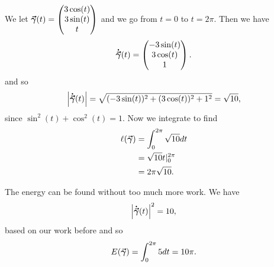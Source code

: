 \documentclass[12pt]{article} %
\begin{document}
\begin{solution}
We let $\boldsymbol{\vec{\gamma}}(t) = \begin{pmatrix} 3\cos (t) \\ 3\sin(t) \\ t\end{pmatrix}$ and we go from $t=0$ to $t=2\pi$. Then we have
\[
\boldsymbol{\dot{\vec{\gamma}}}(t) =\begin{pmatrix} -3\sin(t) \\ 3\cos(t) \\ 1\end{pmatrix}.
\]
and so
\[
\left|\boldsymbol{\dot{\vec{\gamma}}}(t)\right| = \sqrt{(-3\sin (t))^2+(3\cos (t))^2+1^2} = \sqrt{10},
\]
since $\sin^2(t)+\cos^2(t)=1$. Now we integrate to find
\begin{align*}
    \ell(\boldsymbol{\vec{\gamma}}) &= \int_0^{2\pi} \sqrt{10}dt\\
    &= \sqrt{10} t|_0^{2\pi}\\
    &= 2\pi \sqrt{10}.
\end{align*}

The energy can be found without too much more work. We have
\[
\left| \boldsymbol{\dot{\vec{\gamma}}}(t) \right|^2 = 10,
\]
based on our work before and so
\[
E(\boldsymbol{\vec{\gamma}}) = \int_0^{2\pi} 5 dt = 10 \pi.
\]
\end{solution}
\end{document}
